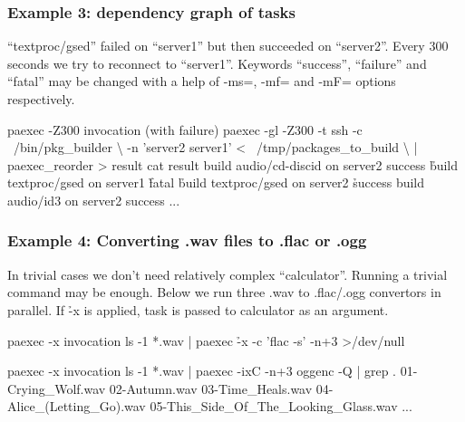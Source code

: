 \documentclass[hyperref={colorlinks=true}]{beamer}
\begin{document}
\begin{frame}[fragile]
  \frametitle{Example 3: dependency graph of tasks}
``textproc/gsed'' failed on ``server1'' but then succeeded on ``server2''.
Every 300 seconds we try to reconnect to ``server1''. Keywords ``success'',
``failure'' and ``fatal'' may be changed with a help of -ms=, -mf= and
-mF= options respectively.
  \begin{block}{}
      \begin{CodeSmall}{paexec -Z300 invocation (with failure)}
\prompt{\$} paexec -gl -Z300 -t ssh -c ~/bin/pkg_builder \textbackslash
      -n 'server2 server1' < ~/tmp/packages_to_build \textbackslash
      | paexec_reorder > result
\prompt{\$} cat result
build audio/cd-discid on server2
success
\h{build textproc/gsed on server1}
\h{fatal}
\h{build textproc/gsed on server2}
\h{success}
build audio/id3 on server2
success
...
\prompt{\$}
      \end{CodeSmall}
  \end{block}
\end{frame}

\begin{frame}[fragile]
  \frametitle{Example 4: Converting .wav files to .flac or .ogg}
In trivial cases we don't need relatively complex ``calculator''.
Running a trivial command may be enough.
Below we run three .wav to .flac/.ogg convertors in parallel.
If \h{-x} is applied, task is passed to calculator as an argument.
\begin{block}{}
  \begin{CodeSmall}{paexec -x invocation}
\prompt{\$} ls -1 *.wav | paexec \h{-x} -c 'flac -s' -n+3 >/dev/null
\prompt{\$}
  \end{CodeSmall}
\end{block}
\begin{block}{}
  \begin{CodeSmall}{paexec -x invocation}
\prompt{\$} ls -1 *.wav | paexec -ixC -n+3 oggenc -Q | grep .
01-Crying_Wolf.wav
02-Autumn.wav
03-Time_Heals.wav
04-Alice_(Letting_Go).wav
05-This_Side_Of_The_Looking_Glass.wav
...
\prompt{\$}
  \end{CodeSmall}
\end{block}
\end{frame}
\end{document}

